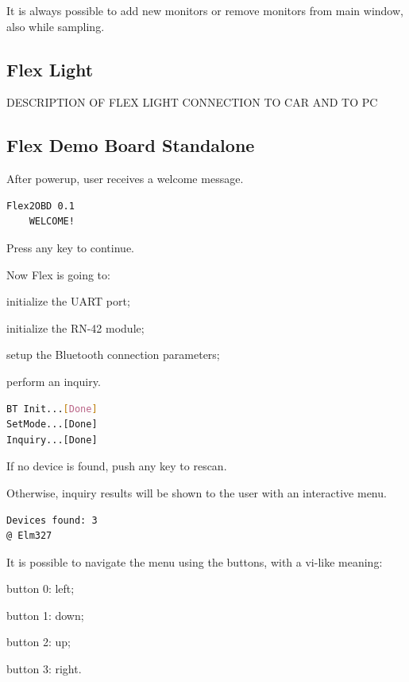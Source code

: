 \documentclass[twoside]{article}
\begin{document}
\begin{multicols}{2}
It is always possible to add new monitors or remove monitors from main window, also while sampling.

\subsection{Flex Light}

DESCRIPTION OF FLEX LIGHT CONNECTION TO CAR AND TO PC

\subsection{Flex Demo Board Standalone}

After powerup, user receives a welcome message.

\begin{lstlisting}[language=bash]
  Flex2OBD 0.1
    WELCOME!
\end{lstlisting}

Press any key to continue.

Now Flex is going to:
\begin{compactitem}
  \item initialize the UART port;
  \item initialize the RN-42 module;
  \item setup the Bluetooth connection parameters;
  \item perform an inquiry.
\end{compactitem}

\begin{lstlisting}[language=bash]
BT Init...[Done]
SetMode...[Done]
Inquiry...[Done]
\end{lstlisting}

If no device is found, push any key to rescan.

Otherwise, inquiry results will be shown to the user with an interactive menu. 

\begin{lstlisting}[language=bash]
Devices found: 3
@ Elm327
\end{lstlisting}

It is possible to navigate the menu using the buttons, with a vi-like meaning:
\begin{compactitem}
  \item button 0: left;
  \item button 1: down;
  \item button 2: up;
  \item button 3: right.
\end{compactitem}


\end{multicols}
\end{document}

